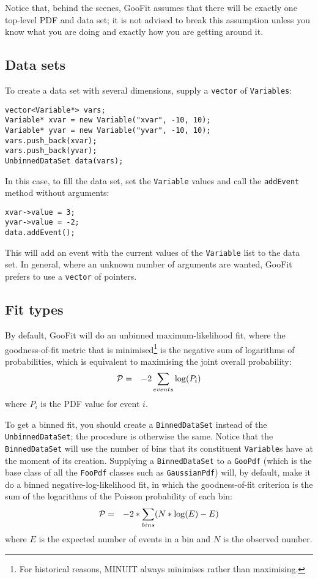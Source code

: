 \documentclass[12pt,pdflatex]{article}
\begin{document}
Notice that, behind the scenes, GooFit assumes that there
will be exactly one top-level PDF and data set; it is not
advised to break this assumption unless you know what you
are doing and exactly how you are getting around it. 

\subsection{Data sets}

To create a data set with several dimensions, supply a \texttt{vector}
of \texttt{Variables}:
\begin{verbatim}
vector<Variable*> vars;
Variable* xvar = new Variable("xvar", -10, 10);
Variable* yvar = new Variable("yvar", -10, 10);
vars.push_back(xvar);
vars.push_back(yvar);
UnbinnedDataSet data(vars);
\end{verbatim}
In this case, to fill the data set, set the \texttt{Variable}
values and call the \texttt{addEvent} method without arguments:
\begin{verbatim}
xvar->value = 3;
yvar->value = -2;
data.addEvent();
\end{verbatim}
This will add an event with the current values of the \texttt{Variable}
list to the data set. In general, where an unknown number of arguments
are wanted, GooFit prefers to use a \texttt{vector} of pointers. 

\subsection{Fit types} 

By default, GooFit will do an unbinned maximum-likelihood fit, where
the goodness-of-fit metric that is minimised\footnote{For historical reasons, 
MINUIT always minimises rather than maximising.} is 
the negative sum of logarithms of 
probabilities, which is equivalent to maximising the joint
overall probability: 
\begin{eqnarray}
{\cal P} &=& -2\sum\limits_{events} \log(P_i)
\end{eqnarray}
where $P_i$ is the PDF value for event $i$. 

To get a binned fit, you should create a \texttt{BinnedDataSet} instead of the
\texttt{UnbinnedDataSet}; the procedure is otherwise the same. Notice that
the \texttt{BinnedDataSet} will use the number of bins that its constituent
\texttt{Variable}s have at the moment of its creation. Supplying a \texttt{BinnedDataSet}
to a \texttt{GooPdf} (which is the base class of all the \texttt{FooPdf}
classes such as \texttt{GaussianPdf}) will, by default, make it
do a binned negative-log-likelihood fit, in which the goodness-of-fit criterion
is the sum of the logarithms of the Poisson probability of each bin:
\begin{eqnarray}
{\cal P} &=& -2*\sum\limits_{bins}(N * \log(E) - E)
\end{eqnarray}
where $E$ is the expected number of events in a bin and $N$ is
the observed number. 
\end{document}
